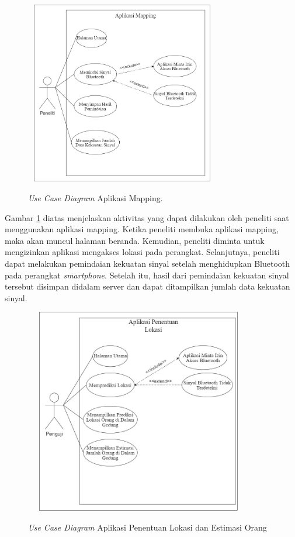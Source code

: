 \begin{figure}[H]
	\center
	\shadowbox
	{\includegraphics [width=8.5cm, height=8cm]{gambar/mapping}}
	\caption{\textit{Use Case Diagram} Aplikasi Mapping.}
	\label{usecasemapping}
\end{figure}

\par Gambar \ref{usecasemapping} diatas menjelaskan aktivitas yang dapat dilakukan oleh peneliti saat menggunakan aplikasi mapping. Ketika peneliti membuka aplikasi mapping, maka akan muncul halaman beranda. Kemudian, peneliti diminta untuk mengizinkan aplikasi mengakses lokasi pada perangkat. Selanjutnya, peneliti dapat melakukan pemindaian kekuatan sinyal setelah menghidupkan Bluetooth pada perangkat \textit{smartphone}. Setelah itu, hasil dari pemindaian kekuatan sinyal tersebut disimpan didalam server dan dapat ditampilkan jumlah data kekuatan sinyal.
\fancyhf{}
\fancyfoot[R]{\thepage}
\begin{figure}[H]
	\center
	\shadowbox
	{\includegraphics [width=10cm, height=9cm]{gambar/penentuanlokasi}}
	\caption{\textit{Use Case Diagram} Aplikasi Penentuan Lokasi dan Estimasi Orang}
	\label{usecasedosen}
\end{figure}

